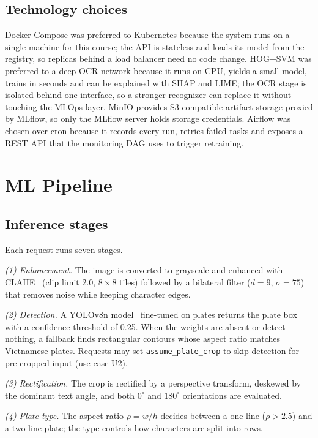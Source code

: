 \documentclass[conference]{IEEEtran}
\newcommand{\code}[1]{\texttt{#1}}
\begin{document}
\subsection{Technology choices}
Docker Compose was preferred to Kubernetes because the system runs on a single
machine for this course; the API is stateless and loads its model from the
registry, so replicas behind a load balancer need no code change. HOG+SVM was
preferred to a deep OCR network because it runs on CPU, yields a small model,
trains in seconds and can be explained with SHAP and LIME; the OCR stage is
isolated behind one interface, so a stronger recognizer can replace it without
touching the MLOps layer. MinIO provides S3-compatible artifact storage proxied by
MLflow, so only the MLflow server holds storage credentials. Airflow was chosen
over cron because it records every run, retries failed tasks and exposes a REST
API that the monitoring DAG uses to trigger retraining.

\section{ML Pipeline}\label{sec:ml}
\subsection{Inference stages}
Each request runs seven stages.

\textit{(1) Enhancement.} The image is converted to grayscale and enhanced with
CLAHE~\cite{zuiderveld1994clahe} (clip limit 2.0, $8\times8$ tiles) followed by a
bilateral filter ($d=9$, $\sigma=75$) that removes noise while keeping character
edges.

\textit{(2) Detection.} A YOLOv8n model~\cite{jocher2023yolov8} fine-tuned on
plates returns the plate box with a confidence threshold of 0.25. When the
weights are absent or detect nothing, a fallback finds rectangular contours whose
aspect ratio matches Vietnamese plates. Requests may set
\code{assume\_plate\_crop} to skip detection for pre-cropped input (use case U2).

\textit{(3) Rectification.} The crop is rectified by a perspective transform,
deskewed by the dominant text angle, and both $0^\circ$ and $180^\circ$
orientations are evaluated.

\textit{(4) Plate type.} The aspect ratio $\rho=w/h$ decides between a one-line
($\rho>2.5$) and a two-line plate; the type controls how characters are split into
rows.
\end{document}
